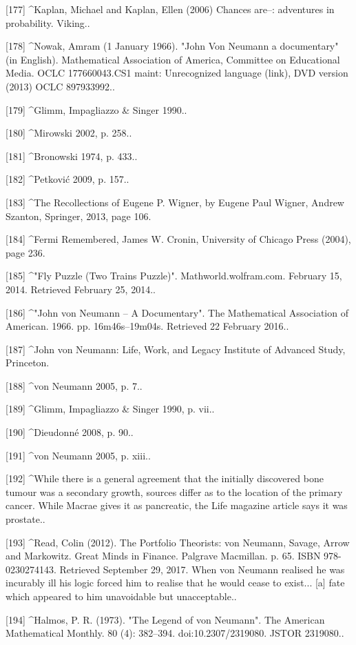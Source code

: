 [177]
^Kaplan, Michael and Kaplan, Ellen (2006) Chances are–: adventures in probability. Viking..

[178]
^Nowak, Amram (1 January 1966). "John Von Neumann a documentary" (in English). Mathematical Association of America, Committee on Educational Media. OCLC 177660043.CS1 maint: Unrecognized language (link), DVD version (2013) OCLC 897933992..

[179]
^Glimm, Impagliazzo & Singer 1990..

[180]
^Mirowski 2002, p. 258..

[181]
^Bronowski 1974, p. 433..

[182]
^Petković 2009, p. 157..

[183]
^The Recollections of Eugene P. Wigner, by Eugene Paul Wigner, Andrew Szanton, Springer, 2013, page 106.

[184]
^Fermi Remembered, James W. Cronin, University of Chicago Press (2004), page 236.

[185]
^"Fly Puzzle (Two Trains Puzzle)". Mathworld.wolfram.com. February 15, 2014. Retrieved February 25, 2014..

[186]
^"John von Neumann – A Documentary". The Mathematical Association of American. 1966. pp. 16m46s–19m04s. Retrieved 22 February 2016..

[187]
^John von Neumann: Life, Work, and Legacy Institute of Advanced Study, Princeton.

[188]
^von Neumann 2005, p. 7..

[189]
^Glimm, Impagliazzo & Singer 1990, p. vii..

[190]
^Dieudonné 2008, p. 90..

[191]
^von Neumann 2005, p. xiii..

[192]
^While there is a general agreement that the initially discovered bone tumour was a secondary growth, sources differ as to the location of the primary cancer. While Macrae gives it as pancreatic, the Life magazine article says it was prostate..

[193]
^Read, Colin (2012). The Portfolio Theorists: von Neumann, Savage, Arrow and Markowitz. Great Minds in Finance. Palgrave Macmillan. p. 65. ISBN 978-0230274143. Retrieved September 29, 2017. When von Neumann realised he was incurably ill his logic forced him to realise that he would cease to exist... [a] fate which appeared to him unavoidable but unacceptable..

[194]
^Halmos, P. R. (1973). "The Legend of von Neumann". The American Mathematical Monthly. 80 (4): 382–394. doi:10.2307/2319080. JSTOR 2319080..

